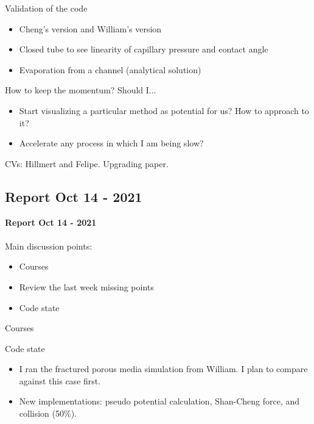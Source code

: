 \documentclass{beamer}
\begin{document}
		\begin{frame}{Validation of the code}
			\justifying
			\begin{itemize}
				\item Cheng's version and William's version
				\item Closed tube to see linearity of capillary pressure and contact angle
				\item Evaporation from a channel (analytical solution)
			\end{itemize}
		\end{frame}
	
		\begin{frame}{How to keep the momentum?}
			Should I...
			\begin{itemize}
				\item Start visualizing a particular method as potential for us? How to approach to it?
				\item Accelerate any process in which I am being slow?
			\end{itemize}
		
			CVs: Hillmert and Felipe. Upgrading paper.
		\end{frame}
	
	\subsection{Report Oct 14 - 2021}
	\justifying
	\begin{frame}
		\textbf{Report Oct 14 - 2021}\\~\\
		Main discussion points:
		\begin{itemize}
			\item Courses
			\item Review the last week missing points
			\item Code state
		\end{itemize}
	\end{frame}
	
	\begin{frame}{Courses}
		
	\end{frame}
	
	\begin{frame}{Code state}
	\begin{itemize}
		\item I ran the fractured porous media simulation from William. I plan to compare against this case first.
		\item New implementations: pseudo potential calculation, Shan-Cheng force, and collision (50\%).
	\end{itemize}
	\end{frame}
\end{document}
